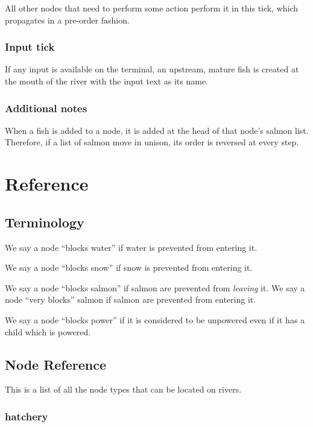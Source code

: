 \documentclass[10pt]{article}
\begin{document}
All other nodes that need to perform some action perform it in this tick, which propagates in a pre-order fashion.

\subsubsection{Input tick}

If any input is available on the terminal, an upstream, mature fish is created at the mouth of the river with the input
text as its name.

\subsubsection{Additional notes}

When a fish is added to a node, it is added at the head of that node's salmon list. Therefore, if a list of salmon move
in unison, its order is reversed at every step.

\section{Reference}

\subsection{Terminology}

We say a node ``blocks water'' if water is prevented from entering it.

We say a node ``blocks snow'' if snow is prevented from entering it.

We say a node ``blocks salmon'' if salmon are prevented from \emph{leaving} it. We say a node ``very blocks''
salmon if salmon are prevented from entering it.

We say a node ``blocks power'' if it is considered to be unpowered even if it has a child which is powered.

\subsection{Node Reference}

\label{sec:nodes}
This is a list of all the node types that can be located on rivers.

\subsubsection{hatchery}
\end{document}
